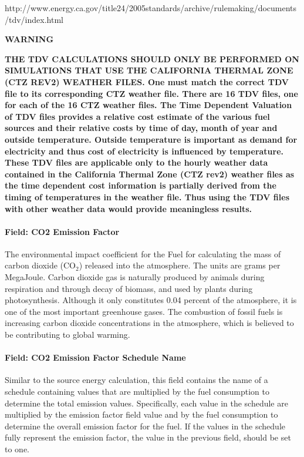 http://www.energy.ca.gov/title24/2005standards/archive/rulemaking/documents/tdv/index.html

\textbf{WARNING}

\textbf{THE TDV CALCULATIONS SHOULD ONLY BE PERFORMED ON SIMULATIONS THAT USE THE CALIFORNIA THERMAL ZONE (CTZ REV2) WEATHER FILES. One must match the correct TDV file to its corresponding CTZ weather file. There are 16 TDV files, one for each of the 16 CTZ weather files. The Time Dependent Valuation of TDV files provides a relative cost estimate of the various fuel sources and their relative costs by time of day, month of year and outside temperature. Outside temperature is important as demand for electricity and thus cost of electricity is influenced by temperature. These TDV files are applicable only to the hourly weather data contained in the California Thermal Zone (CTZ rev2) weather files as the time dependent cost information is partially derived from the timing of temperatures in the weather file. Thus using the TDV files with other weather data would provide meaningless results.}

\paragraph{Field: CO2 Emission Factor}\label{field-co2-emission-factor}

The environmental impact coefficient for the Fuel for calculating the mass of carbon dioxide (CO\(_{2}\)) released into the atmosphere. The units are grams per MegaJoule. Carbon dioxide gas is naturally produced by animals during respiration and through decay of biomass, and used by plants during photosynthesis. Although it only constitutes 0.04 percent of the atmosphere, it is one of the most important greenhouse gases. The combustion of fossil fuels is increasing carbon dioxide concentrations in the atmosphere, which is believed to be contributing to global warming.

\paragraph{Field: CO2 Emission Factor Schedule Name}\label{field-co2-emission-factor-schedule-name}

Similar to the source energy calculation, this field contains the name of a schedule containing values that are multiplied by the fuel consumption to determine the total emission values. Specifically, each value in the schedule are multiplied by the emission factor field value and by the fuel consumption to determine the overall emission factor for the fuel. If the values in the schedule fully represent the emission factor, the value in the previous field, should be set to one.

